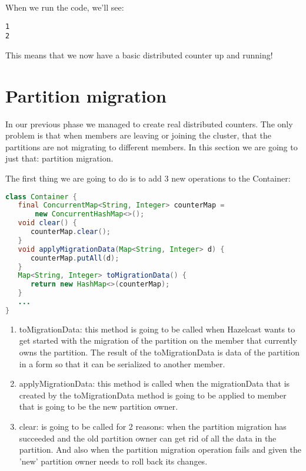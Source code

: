 When we run the code, we'll see:
\begin{lstlisting}
1
2
\end{lstlisting}
This means that we now have a basic distributed counter up and running!

\section{Partition migration}
In our previous phase we managed to create real distributed counters. The only problem is that when members are leaving or joining the cluster, that the partitions are not migrating to different members. In this section we are going to just that: partition migration.

The first thing we are going to do is to add 3 new operations to the Container:
\begin{lstlisting}[language=java]
class Container {
   final ConcurrentMap<String, Integer> counterMap = 
       new ConcurrentHashMap<>();
   void clear() {
      counterMap.clear();
   }
   void applyMigrationData(Map<String, Integer> d) {
      counterMap.putAll(d);
   }
   Map<String, Integer> toMigrationData() {
      return new HashMap<>(counterMap);
   }
   ...
}
\end{lstlisting}
\begin{enumerate}
\item toMigrationData: this method is going to be called when Hazelcast wants to get started with the migration of the partition on the member that currently owns the partition. The result of the toMigrationData is data of the partition in a form so that it can be serialized to another member.
\item applyMigrationData: this method is called when the migrationData that is created by the toMigrationData method is going to be applied to member that is going to be the new partition owner.
\item clear: is going to be called for 2 reasons: when the partition migration has succeeded and the old partition owner can get rid of all the data in the partition. And also when the partition migration operation fails and given the 'new' partition owner needs to roll back its changes.
\end{enumerate}

